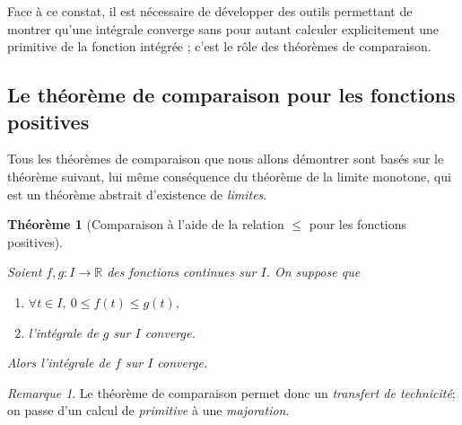 \documentclass[
  french,
  letterpaper,
  DIV=11,
  numbers=noendperiod]{scrreprt}
\providecommand{\tightlist}{%
  \setlength{\itemsep}{0pt}\setlength{\parskip}{0pt}}
\theoremstyle{plain}
\theoremstyle{definition}
\theoremstyle{plain}
\theoremstyle{plain}
\newtheorem{theorem}{Théorème}[chapter]
\theoremstyle{definition}
\theoremstyle{definition}
\theoremstyle{plain}
\theoremstyle{remark}
\newtheorem{refremark}{Remarque}[chapter]
\begin{document}
Face à ce constat, il est nécessaire de développer des outils permettant
de montrer qu'une intégrale converge sans pour autant calculer
explicitement une primitive de la fonction intégrée ; c'est le rôle des
théorèmes de comparaison.

\subsection{Le théorème de comparaison pour les fonctions
positives}\label{le-thuxe9oruxe8me-de-comparaison-pour-les-fonctions-positives}

Tous les théorèmes de comparaison que nous allons démontrer sont basés
sur le théorème suivant, lui même conséquence du théorème de la limite
monotone, qui est un théorème abstrait d'existence de \emph{limites}.

\begin{theorem}[Comparaison à l'aide de la relation \(\leqslant\) pour
les fonctions
positives]\protect\hypertarget{thm-comparaison-relation-leqslant}{}\label{thm-comparaison-relation-leqslant}

Soient \(f,g:I\to \mathbb{R}\) des fonctions continues sur \(I\). On
suppose que

\begin{enumerate}
\def\labelenumi{\arabic{enumi}.}
\tightlist
\item
  \(\forall t \in I,\ 0 \leqslant f(t) \leqslant g(t),\)
\item
  l'intégrale de \(g\) sur \(I\) converge.
\end{enumerate}

Alors l'intégrale de \(f\) sur \(I\) converge.

\end{theorem}

\begin{refremark}
Le théorème de comparaison permet donc un \emph{transfert de
technicité}; on passe d'un calcul de \emph{primitive} à une
\emph{majoration}.

\label{rem-transfert-technique}

\end{refremark}
\end{document}
